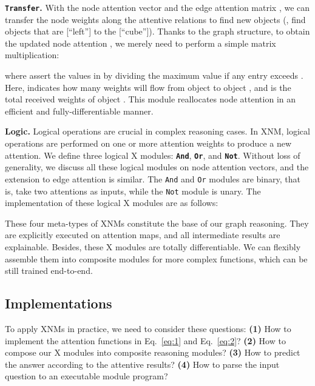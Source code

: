 \documentclass[10pt,twocolumn,letterpaper]{article}
\begin{document}
\textbf{\texttt{Transfer}.}
With the node attention vector  and the edge attention matrix , we can transfer the node weights along the attentive relations to find new objects (\eg, find objects that are [``left''] to the [``cube'']).
Thanks to the graph structure, to obtain the updated node attention , we merely need to perform a simple matrix multiplication:

where  assert the values in  by dividing the maximum value if any entry exceeds .
Here,  indicates how many weights will flow from object  to object , and  is the total received weights of object .
This module reallocates node attention in an efficient and fully-differentiable manner.

\textbf{Logic.}
Logical operations are crucial in complex reasoning cases.
In XNM, logical operations are performed on one or more attention weights to produce a new attention.
We define three logical X modules: \textbf{\texttt{And}}, \textbf{\texttt{Or}}, and \textbf{\texttt{Not}}.
Without loss of generality, we discuss all these logical modules on node attention vectors, and the extension to edge attention is similar.
The \texttt{And} and \texttt{Or} modules are binary, that is, take two attentions as inputs, while the \texttt{Not} module is unary.
The implementation of these logical X modules are as follows:

\vspace{-0.4cm}



These four meta-types of XNMs constitute the base of our graph reasoning.
They are explicitly executed on attention maps, and all intermediate results are explainable.
Besides, these X modules are totally differentiable.
We can flexibly assemble them into composite modules for more complex functions, which can be still trained end-to-end.










\subsection{Implementations}
To apply XNMs in practice, we need to consider these questions:
\textbf{(1)} How to implement the attention functions  in Eq.~\eqref{eq:1} and Eq.~\eqref{eq:2}?
\textbf{(2)} How to compose our X modules into composite reasoning modules? \textbf{(3)} How to predict the answer according to the attentive results?
\textbf{(4)} How to parse the input question to an executable module program?
\end{document}
